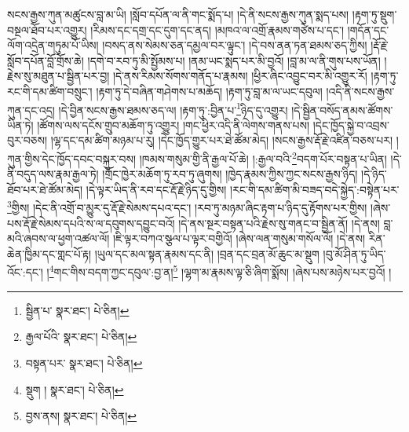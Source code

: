 སངས་རྒྱས་ཀུན་མཚུངས་བླ་མ་ཡི། །སློབ་དཔོན་ལ་ནི་གང་སྨོད་པ། །དེ་ནི་སངས་རྒྱས་ཀུན་སྨད་པས། །རྟག་ཏུ་སྡུག་བསྔལ་ཐོབ་པར་འགྱུར། །རིམས་དང་དགྲ་དང་དུག་དང་ནད། །མཁའ་ལ་འགྲོ་རྣམས་གཙེས་པ་དང་། །གདོན་དང་ལོག་འདྲེན་གཏུམ་པོ་ཡིས། །བསད་ནས་སེམས་ཅན་དམྱལ་བར་ལྟུང་། །དེ་བས་ནན་ཏན་ཐམས་ཅད་ཀྱིས། །རྡོ་རྗེ་སློབ་དཔོན་བློ་གྲོས་ཆེ། །དགེ་བ་རབ་ཏུ་མི་སྤྱོམས་པ། །ནམ་ཡང་སྨད་པར་མི་བྱའོ། །བླ་མ་ལ་ནི་གུས་པས་ཡོན། །རྗེས་སུ་མཐུན་པ་སྦྱིན་པར་བྱ། །དེ་ནས་རིམས་སོགས་གནོད་པ་རྣམས། །ཕྱིར་ཞིང་འབྱུང་བར་མི་འགྱུར་རོ། །རྟག་ཏུ་རང་གི་དམ་ཚིག་བསྲུང་། །རྟག་ཏུ་དེ་བཞིན་གཤེགས་པ་མཆོད། །རྟག་ཏུ་བླ་མ་ལ་ཡང་དབུལ། །འདི་ནི་སངས་རྒྱས་ཀུན་དང་འདྲ། །དེ་བྱིན་སངས་རྒྱས་ཐམས་ཅད་ལ། །རྟག་ཏུ་:བྱིན་པ་\footnote{སྦྱིན་པ་  སྣར་ཐང་།  པེ་ཅིན། }ཉིད་དུ་འགྱུར། །དེ་སྦྱིན་བསོད་ནམས་ཚོགས་ཡིན་ཏེ། །ཚོགས་ལས་དངོས་གྲུབ་མཆོག་ཏུ་འགྱུར། །གང་ཕྱིར་འདི་ནི་ལེགས་གནས་པས། །དེང་ཁྱོད་སྐྱེ་བ་འབྲས་བུར་བཅས། །ལྷ་དང་དམ་ཚིག་མཉམ་པ་རུ། །དེང་ཁྱོད་གྱུར་པར་ཐེ་ཚོམ་མེད། །སངས་རྒྱས་རྡོ་རྗེ་འཛིན་བཅས་པར། །ཀུན་གྱིས་དེང་ཁྱོད་དབང་བསྐུར་བས། །ཁམས་གསུམ་གྱི་ནི་རྒྱལ་པོ་ཆེ། །:རྒྱལ་བའི་\footnote{རྒྱལ་པོའི་  སྣར་ཐང་།  པེ་ཅིན། }བདག་པོར་བསྟན་པ་ཡིན། །དེ་ནི་བདུད་ལས་རྣམ་རྒྱལ་ཏེ། །གྲོང་ཁྱེར་མཆོག་ཏུ་རབ་ཏུ་ཞུགས། །ཁྱེད་རྣམས་ཀྱིས་ཀྱང་སངས་རྒྱས་ཉིད། །དེ་ཉིད་ཐོབ་པར་ཐེ་ཚོམ་མེད། །དེ་ལྟར་ཡིད་ནི་རབ་དང་རྡོ་རྗེ་ཉིད་དུ་གྱིས། །རང་གི་དམ་ཚིག་མི་བཟད་བདེ་སྐྱེད་:བསྟེན་པར་\footnote{བསྟན་པར་  སྣར་ཐང་།  པེ་ཅིན། }གྱིས། །དེང་ནི་འགྲོ་བ་མྱུར་དུ་རྡོ་རྗེ་སེམས་དཔའ་དང་། །རབ་ཏུ་མཉམ་ཞིང་རྟག་པ་ཉིད་དུ་རྟོགས་པར་གྱིས། །ཞེས་པས་རྡོ་རྗེ་སེམས་དཔའི་ས་ལ་དབུགས་དབྱུང་བའོ། །དེ་ནས་སྔར་བསྟན་པའི་རྗེས་སུ་གནང་བ་སྦྱིན་ནོ། །དེ་ནས། བླ་མའི་ཞབས་ལ་ཕྱག་འཚལ་ལོ། །ཇི་ལྟར་བཀའ་སྩལ་པ་ལྟར་བགྱིའོ། །ཞེས་ལན་གསུམ་གསོལ་ལོ། །དེ་ནས། རིན་ཆེན་ཁྱིམ་དང་གླང་པོ་རྟ། །ཡུལ་དང་མལ་སྟན་རྣམས་དང་ནི། །བྲན་དང་བྲན་མོ་ཆུང་མ་སྡུག །བུ་མོ་ཤིན་ཏུ་ཡིད་འོང་:དང་། །\footnote{སྡུག །  སྣར་ཐང་།  པེ་ཅིན། }གང་གིས་བདག་ཀྱང་དབུལ་:བྱ་ན།\footnote{བྱས་ནས།  སྣར་ཐང་།  པེ་ཅིན། } །ལྷག་མ་རྣམས་ལྟ་ཅི་ཞིག་སྨོས། །ཞེས་པས་མཉེས་པར་བྱའོ། །
